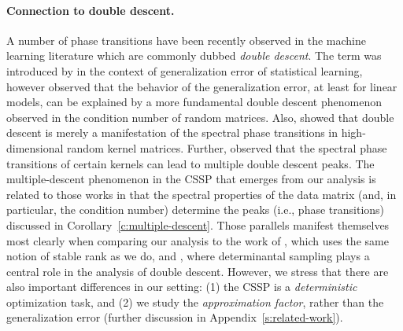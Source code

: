 \documentclass{article}
\begin{document}
\paragraph{Connection to double descent.}
A number of phase transitions have been recently observed in the
machine learning literature which are commonly dubbed \emph{double
  descent}. The term was introduced by \citet{BHMM19} in the context of generalization
error of statistical learning, however
\citet{double-descent-condition} observed that the behavior of the
generalization error, at least for linear models, can be explained by
a more fundamental double descent phenomenon observed in the condition
number of random matrices. Also, \citet{zhenyu2020double} showed that
double descent is merely a manifestation of the
spectral phase transitions in high-dimensional random kernel
matrices. Further, \citet{liang2020multiple} observed that the spectral phase transitions
of certain kernels can lead to multiple double descent peaks. The
multiple-descent phenomenon in the CSSP that 
emerges from our analysis is
related to those works in that the spectral properties of the data
matrix (and, in particular, the condition number) determine the peaks
(i.e., phase transitions) discussed in
Corollary~\ref{c:multiple-descent}. Those parallels manifest
themselves most clearly when comparing our analysis to the work of
\citet{BLLT19_TR}, which uses the same notion of stable rank as we do,
and \citet{surrogate-design}, where determinantal sampling plays a
central role in the analysis of double descent. However, we stress that there are
  also important  differences in our setting: (1) the CSSP is a
  \emph{deterministic} optimization task, and (2) we study the
  \emph{approximation factor}, rather than the generalization error (further discussion in
  Appendix~\ref{s:related-work}).
\end{document}
